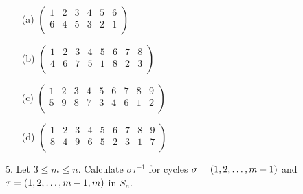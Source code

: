 \begin{mdframed}[style=darkAnswer,frametitle={Joe Starr}]
  \begin{itemize}
    \item [(a)] {
          $\begin{pmatrix}
              1 & 2 & 3 & 4 & 5 & 6 \\
              6 & 4 & 5 & 3 & 2 & 1 \\
            \end{pmatrix}$
          }
    \item [(b)] {
          $\begin{pmatrix}
              1 & 2 & 3 & 4 & 5 & 6 & 7 & 8 \\
              4 & 6 & 7 & 5 & 1 & 8 & 2 & 3 \\
            \end{pmatrix}$
          }
    \item [(c)] {
          $\begin{pmatrix}
              1 & 2 & 3 & 4 & 5 & 6 & 7 & 8 & 9 \\
              5 & 9 & 8 & 7 & 3 & 4 & 6 & 1 & 2 \\
            \end{pmatrix}$
          }
    \item [(d)] {
          $\begin{pmatrix}
              1 & 2 & 3 & 4 & 5 & 6 & 7 & 8 & 9 \\
              8 & 4 & 9 & 6 & 5 & 2 & 3 & 1 & 7 \\
            \end{pmatrix}$
          }
  \end{itemize}
\end{mdframed}
\newpage
\begin{mdframed}[style=darkQuesion]
  5. Let $3\leq m\leq n$. Calculate $\sigma\tau^{-1}$ for cycles
  $\sigma= \left(1,2,\dots , m-1\right)$ and \\ $\tau= \left(1,2,\dots,m-1,m\right)$ in $S_n$.
\end{mdframed}

\begin{mdframed}[style=darkAnswer,frametitle={Joe Starr}]
\end{mdframed}
\newpage
